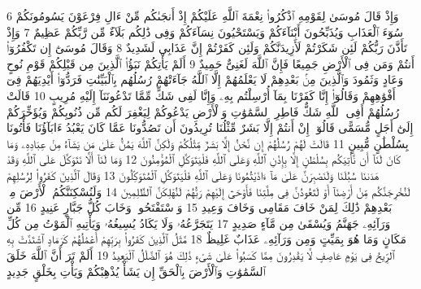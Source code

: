 {\tiny\colorbox{cl_aya}{6}} وَإِذْ قَالَ مُوسَىٰ لِقَوْمِهِ ٱذْكُرُوا۟ نِعْمَةَ ٱللَّهِ عَلَيْكُمْ إِذْ أَنجَىٰكُم مِّنْ ءَالِ فِرْعَوْنَ يَسُومُونَكُمْ سُوٓءَ ٱلْعَذَابِ وَيُذَبِّحُونَ أَبْنَآءَكُمْ وَيَسْتَحْيُونَ نِسَآءَكُمْ وَفِى ذَٰلِكُم بَلَآءٌ مِّن رَّبِّكُمْ عَظِيمٌ
{\tiny\colorbox{cl_aya}{7}} وَإِذْ تَأَذَّنَ رَبُّكُمْ لَئِن شَكَرْتُمْ لَأَزِيدَنَّكُمْ وَلَئِن كَفَرْتُمْ إِنَّ عَذَابِى لَشَدِيدٌ
{\tiny\colorbox{cl_aya}{8}} وَقَالَ مُوسَىٰٓ إِن تَكْفُرُوٓا۟ أَنتُمْ وَمَن فِى ٱلْأَرْضِ جَمِيعًا فَإِنَّ ٱللَّهَ لَغَنِىٌّ حَمِيدٌ
{\tiny\colorbox{cl_aya}{9}} أَلَمْ يَأْتِكُمْ نَبَؤُا۟ ٱلَّذِينَ مِن قَبْلِكُمْ قَوْمِ نُوحٍ وَعَادٍ وَثَمُودَ وَٱلَّذِينَ مِنۢ بَعْدِهِمْ لَا يَعْلَمُهُمْ إِلَّا ٱللَّهُ جَآءَتْهُمْ رُسُلُهُم بِٱلْبَيِّنَٰتِ فَرَدُّوٓا۟ أَيْدِيَهُمْ فِىٓ أَفْوَٰهِهِمْ وَقَالُوٓا۟ إِنَّا كَفَرْنَا بِمَآ أُرْسِلْتُم بِهِۦ وَإِنَّا لَفِى شَكٍّ مِّمَّا تَدْعُونَنَآ إِلَيْهِ مُرِيبٍ
{\tiny\colorbox{cl_aya}{10}} قَالَتْ رُسُلُهُمْ أَفِى ٱللَّهِ شَكٌّ فَاطِرِ ٱلسَّمَٰوَٰتِ وَٱلْأَرْضِ يَدْعُوكُمْ لِيَغْفِرَ لَكُم مِّن ذُنُوبِكُمْ وَيُؤَخِّرَكُمْ إِلَىٰٓ أَجَلٍ مُّسَمًّى قَالُوٓا۟ إِنْ أَنتُمْ إِلَّا بَشَرٌ مِّثْلُنَا تُرِيدُونَ أَن تَصُدُّونَا عَمَّا كَانَ يَعْبُدُ ءَابَآؤُنَا فَأْتُونَا بِسُلْطَٰنٍ مُّبِينٍ
{\tiny\colorbox{cl_aya}{11}} قَالَتْ لَهُمْ رُسُلُهُمْ إِن نَّحْنُ إِلَّا بَشَرٌ مِّثْلُكُمْ وَلَٰكِنَّ ٱللَّهَ يَمُنُّ عَلَىٰ مَن يَشَآءُ مِنْ عِبَادِهِۦ وَمَا كَانَ لَنَآ أَن نَّأْتِيَكُم بِسُلْطَٰنٍ إِلَّا بِإِذْنِ ٱللَّهِ وَعَلَى ٱللَّهِ فَلْيَتَوَكَّلِ ٱلْمُؤْمِنُونَ
{\tiny\colorbox{cl_aya}{12}} وَمَا لَنَآ أَلَّا نَتَوَكَّلَ عَلَى ٱللَّهِ وَقَدْ هَدَىٰنَا سُبُلَنَا وَلَنَصْبِرَنَّ عَلَىٰ مَآ ءَاذَيْتُمُونَا وَعَلَى ٱللَّهِ فَلْيَتَوَكَّلِ ٱلْمُتَوَكِّلُونَ
{\tiny\colorbox{cl_aya}{13}} وَقَالَ ٱلَّذِينَ كَفَرُوا۟ لِرُسُلِهِمْ لَنُخْرِجَنَّكُم مِّنْ أَرْضِنَآ أَوْ لَتَعُودُنَّ فِى مِلَّتِنَا فَأَوْحَىٰٓ إِلَيْهِمْ رَبُّهُمْ لَنُهْلِكَنَّ ٱلظَّٰلِمِينَ
{\tiny\colorbox{cl_aya}{14}} وَلَنُسْكِنَنَّكُمُ ٱلْأَرْضَ مِنۢ بَعْدِهِمْ ذَٰلِكَ لِمَنْ خَافَ مَقَامِى وَخَافَ وَعِيدِ
{\tiny\colorbox{cl_aya}{15}} وَٱسْتَفْتَحُوا۟ وَخَابَ كُلُّ جَبَّارٍ عَنِيدٍ
{\tiny\colorbox{cl_aya}{16}} مِّن وَرَآئِهِۦ جَهَنَّمُ وَيُسْقَىٰ مِن مَّآءٍ صَدِيدٍ
{\tiny\colorbox{cl_aya}{17}} يَتَجَرَّعُهُۥ وَلَا يَكَادُ يُسِيغُهُۥ وَيَأْتِيهِ ٱلْمَوْتُ مِن كُلِّ مَكَانٍ وَمَا هُوَ بِمَيِّتٍ وَمِن وَرَآئِهِۦ عَذَابٌ غَلِيظٌ
{\tiny\colorbox{cl_aya}{18}} مَّثَلُ ٱلَّذِينَ كَفَرُوا۟ بِرَبِّهِمْ أَعْمَٰلُهُمْ كَرَمَادٍ ٱشْتَدَّتْ بِهِ ٱلرِّيحُ فِى يَوْمٍ عَاصِفٍ لَّا يَقْدِرُونَ مِمَّا كَسَبُوا۟ عَلَىٰ شَىْءٍ ذَٰلِكَ هُوَ ٱلضَّلَٰلُ ٱلْبَعِيدُ
{\tiny\colorbox{cl_aya}{19}} أَلَمْ تَرَ أَنَّ ٱللَّهَ خَلَقَ ٱلسَّمَٰوَٰتِ وَٱلْأَرْضَ بِٱلْحَقِّ إِن يَشَأْ يُذْهِبْكُمْ وَيَأْتِ بِخَلْقٍ جَدِيدٍ
